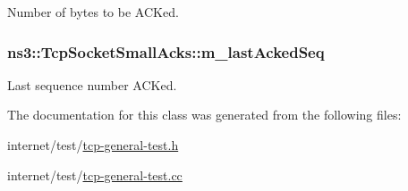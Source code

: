 Number of bytes to be A\+C\+Ked. 

\subsubsection[{\texorpdfstring{m\+\_\+last\+Acked\+Seq}{m_lastAckedSeq}}]{ ns3\+::\+Tcp\+Socket\+Small\+Acks\+::m\+\_\+last\+Acked\+Seq\hspace{0.3cm}{\ttfamily [protected]}}\hypertarget{classns3_1_1TcpSocketSmallAcks_a7e45496712cf340a50b856f580a88561}{}\label{classns3_1_1TcpSocketSmallAcks_a7e45496712cf340a50b856f580a88561}


Last sequence number A\+C\+Ked. 



The documentation for this class was generated from the following files\+:\begin{DoxyCompactItemize}
\item 
internet/test/\hyperlink{tcp-general-test_8h}{tcp-\/general-\/test.\+h}\item 
internet/test/\hyperlink{tcp-general-test_8cc}{tcp-\/general-\/test.\+cc}\end{DoxyCompactItemize}

